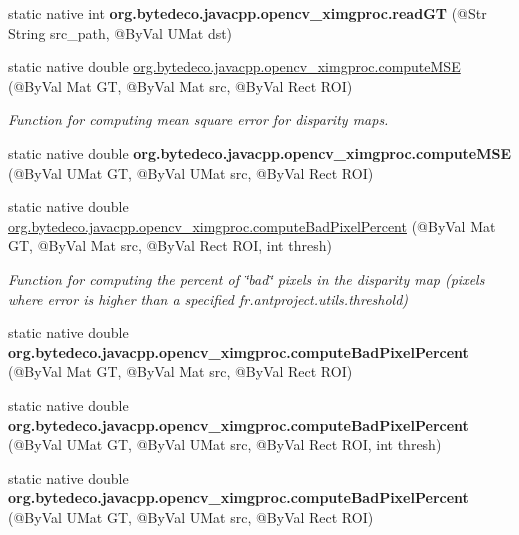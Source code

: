 \begin{DoxyCompactItemize}
static native int {\bfseries org.\+bytedeco.\+javacpp.\+opencv\+\_\+ximgproc.\+read\+GT} (@Str String src\+\_\+path, @By\+Val U\+Mat dst)
\item 
static native double \hyperlink{group__ximgproc__filters_ga0f224e6315d538e257cba2fb7ae0bbee}{org.\+bytedeco.\+javacpp.\+opencv\+\_\+ximgproc.\+compute\+M\+SE} (@By\+Val Mat GT, @By\+Val Mat src, @By\+Val Rect R\+OI)
\begin{DoxyCompactList}\small\item\em Function for computing mean square error for disparity maps. \end{DoxyCompactList}\item 
\mbox{\label{group__ximgproc__filters_gaa5a111b6f736e796e2dcd39708103a9a}} 
static native double {\bfseries org.\+bytedeco.\+javacpp.\+opencv\+\_\+ximgproc.\+compute\+M\+SE} (@By\+Val U\+Mat GT, @By\+Val U\+Mat src, @By\+Val Rect R\+OI)
\item 
static native double \hyperlink{group__ximgproc__filters_ga04b04ac57f6b8c53deacbb1d41d05766}{org.\+bytedeco.\+javacpp.\+opencv\+\_\+ximgproc.\+compute\+Bad\+Pixel\+Percent} (@By\+Val Mat GT, @By\+Val Mat src, @By\+Val Rect R\+OI, int thresh)
\begin{DoxyCompactList}\small\item\em Function for computing the percent of \char`\"{}bad\char`\"{} pixels in the disparity map (pixels where error is higher than a specified fr.antproject.utils.threshold) \end{DoxyCompactList}\item
\mbox{\label{group__ximgproc__filters_ga3b1ead374777b604f8179da429d2a3d9}} 
static native double {\bfseries org.\+bytedeco.\+javacpp.\+opencv\+\_\+ximgproc.\+compute\+Bad\+Pixel\+Percent} (@By\+Val Mat GT, @By\+Val Mat src, @By\+Val Rect R\+OI)
\item 
\mbox{\label{group__ximgproc__filters_gad27163e89fa755060f5a8ff25d212ece}} 
static native double {\bfseries org.\+bytedeco.\+javacpp.\+opencv\+\_\+ximgproc.\+compute\+Bad\+Pixel\+Percent} (@By\+Val U\+Mat GT, @By\+Val U\+Mat src, @By\+Val Rect R\+OI, int thresh)
\item 
\mbox{\label{group__ximgproc__filters_ga550075193f0c2a6513aaad542680a368}} 
static native double {\bfseries org.\+bytedeco.\+javacpp.\+opencv\+\_\+ximgproc.\+compute\+Bad\+Pixel\+Percent} (@By\+Val U\+Mat GT, @By\+Val U\+Mat src, @By\+Val Rect R\+OI)

\end{DoxyCompactItemize}
